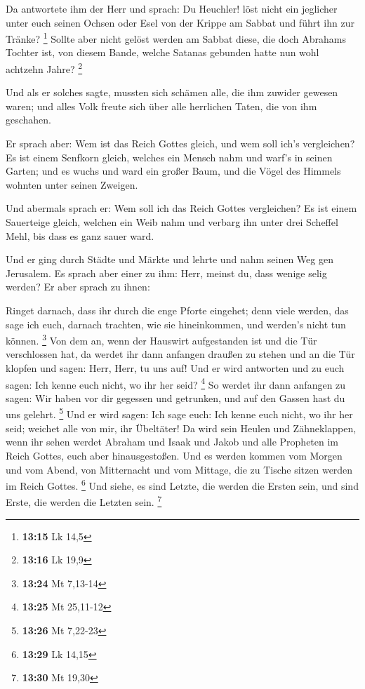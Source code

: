  Da antwortete ihm der Herr und sprach: Du Heuchler! löst
nicht ein jeglicher unter euch seinen Ochsen oder Esel von der Krippe am
Sabbat und führt ihn zur Tränke? \footnote{\textbf{13:15} Lk 14,5}
 Sollte aber nicht gelöst werden am Sabbat diese, die
doch Abrahams Tochter ist, von diesem Bande, welche Satanas gebunden
hatte nun wohl achtzehn Jahre? \footnote{\textbf{13:16} Lk 19,9}

 Und als er solches sagte, mussten sich schämen alle, die
ihm zuwider gewesen waren; und alles Volk freute sich über alle
herrlichen Taten, die von ihm geschahen.

 Er sprach aber: Wem ist das Reich Gottes gleich, und wem
soll ich's vergleichen?  Es ist einem Senfkorn gleich,
welches ein Mensch nahm und warf's in seinen Garten; und es wuchs und
ward ein großer Baum, und die Vögel des Himmels wohnten unter seinen
Zweigen.

 Und abermals sprach er: Wem soll ich das Reich Gottes
vergleichen?  Es ist einem Sauerteige gleich, welchen ein
Weib nahm und verbarg ihn unter drei Scheffel Mehl, bis dass es ganz
sauer ward.

 Und er ging durch Städte und Märkte und lehrte und nahm
seinen Weg gen Jerusalem.  Es sprach aber einer zu ihm:
Herr, meinst du, dass wenige selig werden? Er aber sprach zu ihnen:

 Ringet darnach, dass ihr durch die enge Pforte eingehet;
denn viele werden, das sage ich euch, darnach trachten, wie sie
hineinkommen, und werden's nicht tun können. \footnote{\textbf{13:24} Mt
  7,13-14}  Von dem an, wenn der Hauswirt aufgestanden
ist und die Tür verschlossen hat, da werdet ihr dann anfangen draußen zu
stehen und an die Tür klopfen und sagen: Herr, Herr, tu uns auf! Und er
wird antworten und zu euch sagen: Ich kenne euch nicht, wo ihr her seid?
\footnote{\textbf{13:25} Mt 25,11-12}  So werdet ihr dann
anfangen zu sagen: Wir haben vor dir gegessen und getrunken, und auf den
Gassen hast du uns gelehrt. \footnote{\textbf{13:26} Mt 7,22-23}
 Und er wird sagen: Ich sage euch: Ich kenne euch nicht,
wo ihr her seid; weichet alle von mir, ihr Übeltäter!  Da
wird sein Heulen und Zähneklappen, wenn ihr sehen werdet Abraham und
Isaak und Jakob und alle Propheten im Reich Gottes, euch aber
hinausgestoßen.  Und es werden kommen vom Morgen und vom
Abend, von Mitternacht und vom Mittage, die zu Tische sitzen werden im
Reich Gottes. \footnote{\textbf{13:29} Lk 14,15}  Und
siehe, es sind Letzte, die werden die Ersten sein, und sind Erste, die
werden die Letzten sein. \footnote{\textbf{13:30} Mt 19,30}

